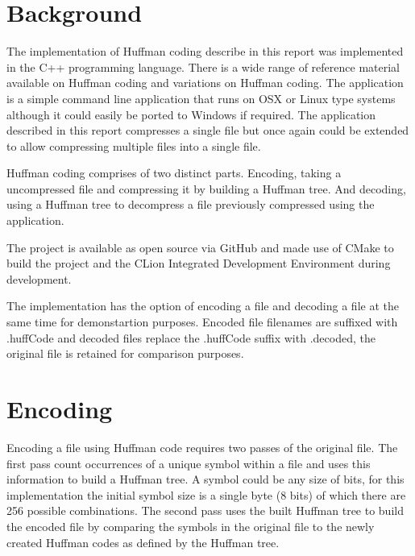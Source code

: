 

\section{Background}


\singlespacing
The implementation of Huffman coding describe in this report was implemented in the C++ programming language. There is a wide range of reference material available on Huffman coding and variations on Huffman coding. The application is a simple command line application that runs on OSX or Linux type systems although it could easily be ported to Windows if required. The application described in this report compresses a single file but once again could be extended to allow compressing multiple files into a single file.


\doublespacing
\singlespacing
Huffman coding comprises of two distinct parts. Encoding, taking a uncompressed file and compressing it by building a Huffman tree. And decoding, using a Huffman tree to decompress a file previously compressed using the application.


\doublespacing
\singlespacing
The project is available as open source via GitHub \cite{GitLink} and made use of CMake to build the project and the CLion Integrated Development Environment during development.


\doublespacing
\singlespacing
The implementation has the option of encoding a file and decoding a file at the same time for demonstartion purposes. Encoded file filenames are suffixed with .huffCode and decoded files replace the .huffCode suffix with .decoded, the original file is retained for comparison purposes.


\doublespacing
\singlespacing
\section{Encoding}


\singlespacing
Encoding a file using Huffman code requires two passes of the original file. The first pass count occurrences of a unique symbol within a file and uses this information to build a Huffman tree. A symbol could be any size of bits, for this implementation the initial symbol size is a single byte (8 bits) of which there are 256 possible combinations. The second pass uses the built Huffman tree to build the encoded file by comparing the symbols in the original file to the newly created Huffman codes as defined by the Huffman tree.


\doublespacing
\singlespacing
